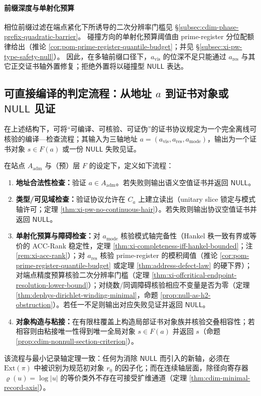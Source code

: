 \paragraph{前缀深度与单射化预算}
相位前缀过滤在端点紧化下所诱导的二次分辨率门槛见 \S\ref{subsec:cdim-phase-prefix-quadratic-barrier}。
碰撞方向的单射化预算阈值由 prime-register 分位配额律给出（推论 \ref{cor:pom-prime-register-quantile-budget}；并见 \S\ref{subsec:xi-pw-type-safety-null}）。
因此，在多轴前缀口径下，\(a_{\mathrm{vis}}\) 的位深不足只能通过 \(a_{\mathrm{res}}\) 与其它正交证书轴外置修复；拒绝外置将以碰撞型 \(\mathsf{NULL}\) 表达。

\subsection{可直接编译的判定流程：从地址 \texorpdfstring{$a$}{a} 到证书对象或 \texorpdfstring{$\mathsf{NULL}$}{NULL} 见证}\label{subsec:cdim-address-compiler}
在上述结构下，可将“可编译、可核验、可证伪”的证书协议规定为一个完全离线可核验的编译—检查流程；其输入为三轴地址 \(a=(a_{\mathrm{vis}},a_{\mathrm{res}},a_{\mathrm{mode}})\)，输出为一个证书对象 \(s\in F(a)\) 或一份 \(\mathsf{NULL}\) 失败见证。

\begin{algorithm}\label{alg:cdim-three-axis-address-compile}
在站点 \(A_{\mathrm{adm}}\) 与（预）层 \(F\) 的设定下，定义如下流程：
\begin{enumerate}
  \item \textbf{地址合法性检查：}验证 \(a\in A_{\mathrm{adm}}\)。若失败则输出语义空值证书并返回 \(\mathsf{NULL}\)。
  \item \textbf{类型/可见域检查：}验证协议允许在 \(C_a\) 上建立读出（unitary slice 锁定与模式轴许可；定理 \ref{thm:xi-pw-no-continuous-hair}）。若失败则输出协议空值证书并返回 \(\mathsf{NULL}\)。
  \item \textbf{单射化预算与障碍检查：}对 \(a_{\mathrm{mode}}\) 核验模式轴完备性（Hankel 秩一致有界或等价的 ACC-Rank 稳定性，定理 \ref{thm:xi-completeness-iff-hankel-bounded}；注 \ref{rem:xi-acc-rank}）；对 \(a_{\mathrm{res}}\) 核验 prime-register 的模积阈值（推论 \ref{cor:pom-prime-register-quantile-budget} 或定理 \ref{thm:address-defect-law} 的硬下界）；对端点精度预算核验二次分辨率门槛（定理 \ref{thm:xi-offcritical-endpoint-resolution-lower-bound}）；对绕数/同调障碍核验相应不变量是否为零（定理 \ref{thm:dephys-dirichlet-winding-minimal}，命题 \ref{prop:null-as-h2-obstruction}）。若任一不足则输出对应失败见证并返回 \(\mathsf{NULL}\)。
  \item \textbf{对象构造与粘接：}在有限柱覆盖上构造局部证书对象族并核验交叠相容性；若相容则由粘接唯一性得到唯一全局对象 \(s\in F(a)\) 并返回 \(s\)（命题 \ref{prop:cdim-nonnull-section-criterion}）。
\end{enumerate}
\end{algorithm}
该流程与最小记录轴定理一致：任何为消除 \(\mathsf{NULL}\) 而引入的新轴，必须在 \(\mathrm{Ext}(\pi)\) 中被识别为规范初对象 \(r_0\) 的因子化；而在连续轴层面，除径向寄存器 \(\varrho(u)=\log|u|\) 的等价类外不存在可接受扩维通道（定理 \ref{thm:cdim-minimal-record-axis}）。

